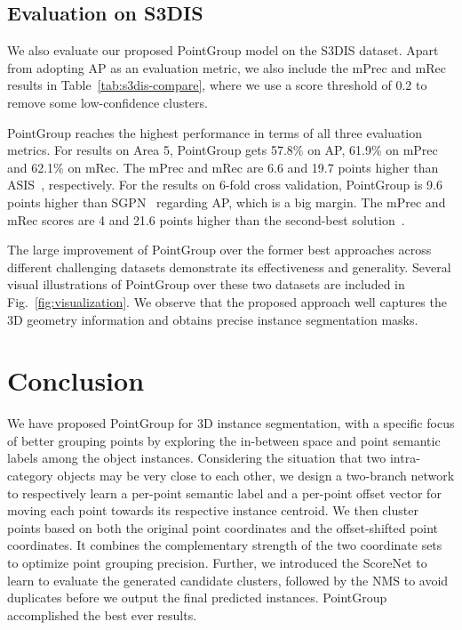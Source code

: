 \documentclass[10pt,twocolumn,letterpaper]{article}
\begin{document}
\subsection{Evaluation on S3DIS}
We also evaluate our proposed PointGroup model on the S3DIS dataset. 
Apart from adopting AP as an evaluation metric, we also include the mPrec and mRec results in Table~\ref{tab:s3dis-compare}, where we use a score threshold of 0.2 to remove some low-confidence clusters. 

PointGroup reaches the highest performance in terms of all three evaluation metrics. For results on Area 5, PointGroup gets 57.8\% on AP, 61.9\% on mPrec and 62.1\% on mRec. The mPrec and mRec are 6.6 and 19.7 points higher than ASIS~\cite{wang2019associatively}, respectively. For the results on 6-fold cross validation, PointGroup is 9.6 points higher than 
SGPN~\cite{wang2018sgpn} regarding AP, which is a big margin. 
The mPrec and mRec scores are 4 and 21.6 points higher than the second-best solution~\cite{yang2019learning}. 

The large improvement of PointGroup over the former best approaches across different challenging datasets demonstrate its effectiveness and generality. Several visual illustrations of PointGroup over these two datasets are included in Fig.~\ref{fig:visualization}. We observe that the proposed approach well captures the 3D geometry information and obtains precise instance segmentation masks.

\section{Conclusion}
We have proposed PointGroup for 3D instance segmentation, with a specific focus of better grouping points by exploring the in-between space and point semantic labels among the object instances.
Considering the situation that two intra-category objects may be very close to each other, we design a two-branch network to respectively learn a per-point semantic label and a per-point offset vector for moving each point towards its respective instance centroid. 
We then cluster points based on both the original point coordinates and the offset-shifted point coordinates. It combines the complementary strength of the two coordinate sets to optimize point grouping precision. Further, we introduced the ScoreNet to learn to evaluate the generated candidate clusters, followed by the NMS to avoid duplicates before we output the final predicted instances. 
PointGroup accomplished the best ever results. 
\end{document}
